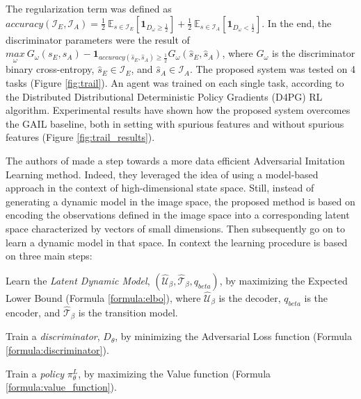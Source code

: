\begin{enumerate*}[label=(\textbf{\arabic*})]
\end{enumerate*} The regularization term was defined as $\textit{accuracy}(\mathcal{I}_{E}, \mathcal{I}_{A}) = \frac{1}{2} \ \mathbb{E}_{s \in \mathcal{I}_{E}} \left[ \mathbf{1}_{D_{\omega} \geq  \frac{1}{2}}\right] + \frac{1}{2} \ \mathbb{E}_{s \in \mathcal{I}_{A}} \left[ \mathbf{1}_{D_{\omega} <  \frac{1}{2}}\right]$. In the end, the discriminator parameters were the result of $\underset{\omega}{max} \ G_{\omega}(s_{E},s_{A}) - \mathbf{1}_{\textit{accuracy}(\hat{s}_{E},\hat{s}_{A}) \geq \frac{1}{2}} G_{\omega}(\hat{s}_{E},\hat{s}_{A})$, where $G_{\omega}$ is the discriminator binary cross-entropy, $\hat{s}_{E} \in \mathcal{I}_{E}$, and $\hat{s}_{A} \in \mathcal{I}_{A}$. The proposed system was tested on 4 tasks (Figure \ref{fig:trail}). An agent was trained on each single task, according to the Distributed Distributional Deterministic Policy Gradients (D4PG) \cite{barth2018d4pg} RL algorithm. Experimental results have shown how the proposed system overcomes the GAIL \cite{ho2016gail} baseline, both in setting with spurious features and without spurious features (Figure \ref{fig:trail_results}). 
 

\noindent The authors of \cite{rafailov2021visual_ail} made a step towards a more data efficient Adversarial Imitation Learning method. Indeed, they leveraged the idea of using a model-based approach in the context of high-dimensional state space. Still, instead of generating a dynamic model in the image space, the proposed method is based on encoding the observations defined in the image space into a corresponding latent space characterized by vectors of small dimensions. Then subsequently go on to learn a dynamic model in that space. In context the learning procedure is based on three main steps: \begin{enumerate*}[label=\textbf{(\arabic*)}]
    \item Learn the \textit{Latent Dynamic Model}, $(\hat{\mathcal{U}}_{\beta},\hat{\mathcal{T}}_{\beta}, q_{beta})$, by maximizing the Expected Lower Bound (Formula \ref{formula:elbo}), where $\hat{\mathcal{U}}_{\beta}$ is the decoder, $q_{beta}$ is the encoder, and $\hat{\mathcal{T}}_{\beta}$ is the transition model.
    \item Train a \textit{discriminator}, $D_{\theta}$, by minimizing the Adversarial Loss function (Formula \ref{formula:discriminator}).
    \item Train a \textit{policy} $\pi^{L}_{\theta}$, by maximizing the Value function (Formula \ref{formula:value_function}).
\end{enumerate*} 
